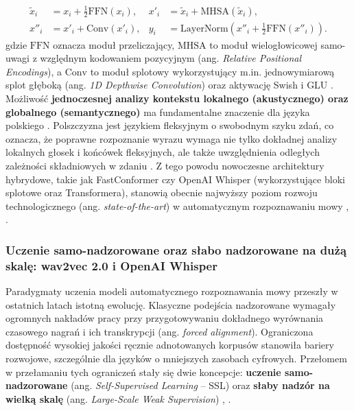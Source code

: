 \begin{align}
    \tilde{x}_i &= x_i + \frac{1}{2}\text{FFN}(x_i), &
    x'_i &= \tilde{x}_i + \text{MHSA}(\tilde{x}_i), \\
    x''_i &= x'_i + \text{Conv}(x'_i), &
    y_i &= \text{LayerNorm}\left(x''_i + \frac{1}{2}\text{FFN}(x''_i)\right).
\end{align}
gdzie $\text{FFN}$ oznacza moduł przeliczający, $\text{MHSA}$ to moduł wielogłowicowej samo-uwagi z względnym kodowaniem pozycyjnym (ang. \textit{Relative Positional Encodings}), a $\text{Conv}$ to moduł splotowy wykorzystujący m.in. jednowymiarową splot głęboką (ang. \textit{1D Depthwise Convolution}) oraz aktywację Swish i GLU \cite[s.~2]{gulati2020conformer}. Możliwość \textbf{jednoczesnej analizy kontekstu lokalnego (akustycznego) oraz globalnego (semantycznego)} ma fundamentalne znaczenie dla języka polskiego \cite[s.~315--316]{pondel2024e2e}. Polszczyzna jest językiem fleksyjnym o swobodnym szyku zdań, co oznacza, że poprawne rozpoznanie wyrazu wymaga nie tylko dokładnej analizy lokalnych głosek i końcówek fleksyjnych, ale także uwzględnienia odległych zależności składniowych w zdaniu \cite[s.~315--316]{pondel2024e2e}. Z tego powodu nowoczesne architektury hybrydowe, takie jak FastConformer czy OpenAI Whisper (wykorzystujące bloki splotowe oraz Transformera), stanowią obecnie najwyższy poziom rozwoju technologicznego (ang. \textit{state-of-the-art}) w automatycznym rozpoznawaniu mowy \cite[s.~1]{radford2023robust}, \cite[s.~316]{pondel2024e2e}.




\subsubsection{Uczenie samo-nadzorowane oraz słabo nadzorowane na dużą skalę: wav2vec 2.0 i OpenAI Whisper}
\label{subsubsec:ssl_weak_supervision}

Paradygmaty uczenia modeli automatycznego rozpoznawania mowy przeszły w ostatnich latach istotną ewolucję. Klasyczne podejścia nadzorowane wymagały ogromnych nakładów pracy przy przygotowywaniu dokładnego wyrównania czasowego nagrań i ich transkrypcji (ang. \textit{forced alignment}). Ograniczona dostępność wysokiej jakości ręcznie adnotowanych korpusów stanowiła bariery rozwojowe, szczególnie dla języków o mniejszych zasobach cyfrowych. Przełomem w przełamaniu tych ograniczeń stały się dwie koncepcje: \textbf{uczenie samo-nadzorowane} (ang. \textit{Self-Supervised Learning} -- SSL) oraz \textbf{słaby nadzór na wielką skalę} (ang. \textit{Large-Scale Weak Supervision}) \cite[s.~1]{baevski2020wav2vec}, \cite[s.~1]{radford2023robust}.


